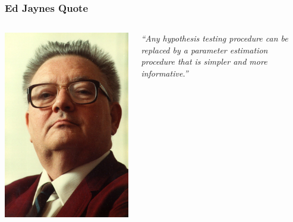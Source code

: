 \documentclass{beamer}
\begin{document}
\begin{frame}
\frametitle{Ed Jaynes Quote}

    \begin{columns} %
        \includegraphics[width=0.7\linewidth]{images/jaynes.jpg}

        {\em ``Any hypothesis testing
procedure can be
replaced by a parameter
estimation procedure that
is simpler and more
informative.''}
     \end{columns}

\end{frame}
\end{document}

